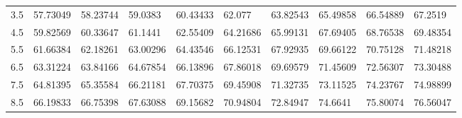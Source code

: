 \documentclass[10pt,twocolumn,letterpaper]{article}
\begin{document}
\begin{table}
{\begin{tabular}{llllllllll}
    3.5             & 57.73049                               & 58.23744                               & 59.0383                                 & 60.43433                                & 62.077                                  & 63.82543                                & 65.49858                                & 66.54889                                & 67.2519                                 \\
    4.5             & 59.82569                               & 60.33647                               & 61.1441                                 & 62.55409                                & 64.21686                                & 65.99131                                & 67.69405                                & 68.76538                                & 69.48354                                \\
    5.5             & 61.66384                               & 62.18261                               & 63.00296                                & 64.43546                                & 66.12531                                & 67.92935                                & 69.66122                                & 70.75128                                & 71.48218                                \\
    6.5             & 63.31224                               & 63.84166                               & 64.67854                                & 66.13896                                & 67.86018                                & 69.69579                                & 71.45609                                & 72.56307                                & 73.30488                                \\
    7.5             & 64.81395                               & 65.35584                               & 66.21181                                & 67.70375                                & 69.45908                                & 71.32735                                & 73.11525                                & 74.23767                                & 74.98899                                \\
    8.5             & 66.19833                               & 66.75398                               & 67.63088                                & 69.15682                                & 70.94804                                & 72.84947                                & 74.6641                                 & 75.80074                                & 76.56047                                \\

\end{tabular}}
\end{table}
\end{document}
